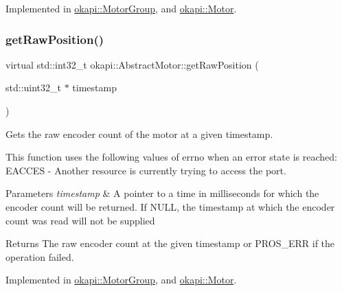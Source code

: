 Implemented in \mbox{\hyperlink{classokapi_1_1MotorGroup_a67bdc04d59ba8293ccd58d26b849c9f0}{okapi\+::\+Motor\+Group}}, and \mbox{\hyperlink{classokapi_1_1Motor_a992171c86829e52f5418988fada0b6fa}{okapi\+::\+Motor}}.

\mbox{\label{classokapi_1_1AbstractMotor_aa34fefa954fbff26e3d68e59c4f10964}} 
\subsubsection{\texorpdfstring{getRawPosition()}{getRawPosition()}}
{\footnotesize\ttfamily virtual std\+::int32\+\_\+t okapi\+::\+Abstract\+Motor\+::get\+Raw\+Position (\begin{DoxyParamCaption}\item[{std\+::uint32\+\_\+t $\ast$}]{timestamp }\end{DoxyParamCaption})\hspace{0.3cm}{\ttfamily [pure virtual]}}

Gets the raw encoder count of the motor at a given timestamp.

This function uses the following values of errno when an error state is reached\+: E\+A\+C\+C\+ES -\/ Another resource is currently trying to access the port.


\begin{DoxyParams}{Parameters}
{\em timestamp} & A pointer to a time in milliseconds for which the encoder count will be returned. If N\+U\+LL, the timestamp at which the encoder count was read will not be supplied\\
\hline
\end{DoxyParams}
\begin{DoxyReturn}{Returns}
The raw encoder count at the given timestamp or P\+R\+O\+S\+\_\+\+E\+RR if the operation failed. 
\end{DoxyReturn}


Implemented in \mbox{\hyperlink{classokapi_1_1MotorGroup_ac7d9b049f24ddc141b2b63f7e3e4d3ba}{okapi\+::\+Motor\+Group}}, and \mbox{\hyperlink{classokapi_1_1Motor_a74c579c35863bc5180c9551fd5185d94}{okapi\+::\+Motor}}.

\mbox{\label{classokapi_1_1AbstractMotor_a144377e461ec5801289c37bab5132cce}} 
